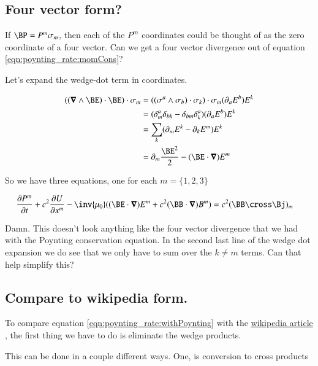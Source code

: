 \subsection{Four vector form? }

If $\BP = P^m \sigma_m$, then each of the $P^m$ coordinates could be thought of as the zero coordinate of a four vector.  Can we get a four vector
divergence out of equation \ref{eqn:poynting_rate:momCons}?

Let's expand the wedge-dot term in coordinates.

\begin{align*}
( (\spacegrad \wedge \BE ) \cdot \BE ) \cdot \sigma_m
&= ((\sigma^a \wedge \sigma_b) \cdot \sigma_k ) \cdot \sigma_m (\partial_a E^b) E^k \\
&= (\delta^a_m \delta_{bk} - \delta_{bm} \delta^a_k) (\partial_a E^b) E^k \\
&= \sum_k (\partial_m E^k - \partial_k E^m) E^k \\
&= \partial_m \frac{\BE^2}{2} - (\BE \cdot \spacegrad) E^m \\
\end{align*}

So we have three equations, one for each $m = \{1,2,3\}$

\begin{align}\label{eqn:poynting_rate:coordinates}
\PD{t}{P^m} + c^2 \PD{x^m}{U} - \inv{\mu_0}( (\BE \cdot \spacegrad) E^m + c^2 (\BB \cdot \spacegrad) B^m ) &= c^2 (\BB \cross \Bj)_m
\end{align}

Damn.  This doesn't look anything like the four vector divergence that we had with the Poynting conservation equation.  In the second last line
of the wedge dot expansion we do see that we only have to sum over the $k \ne m$ terms.  Can that help simplify this?

\subsection{Compare to wikipedia form. }

To compare equation \ref{eqn:poynting_rate:withPoynting} with the
\href{http://en.wikipedia.org/wiki/Electromagnetic_stress-energy_tensor#Conservation_laws}{wikipedia article}
, the first thing we have to do is eliminate the wedge
products.

This can be done in a couple different ways.  One, is conversion to cross products

